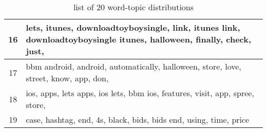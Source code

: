 \begin{table}
\begin{tabular}{c p{16cm}}
    16    & lets, itunes, downloadtoyboysingle, link, itunes link, downloadtoyboysingle itunes, halloween, finally, check, just, \\ \midrule
    17    & bbm android, android, automatically, halloween, store, love, street, know, app, don, \\ \midrule
    18    & ios, apps, lets apps, ios lets, bbm ios, features, visit, app, spree, store, \\ \midrule
    19    & case, hashtag, end, 4s, black, bids, bids end, using, time, price \\ \midrule
  \end{tabular}
  \caption{list of 20 word-topic distributions}
  \label{tab:unigrams_bigrams_lda}
\end{table}

